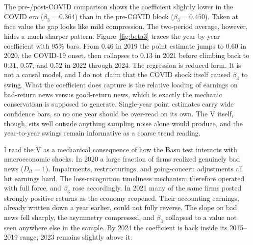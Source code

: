 \documentclass[12pt]{article}
\begin{document}
The pre-/post-COVID comparison shows the coefficient slightly lower in the COVID era ($\beta_{3} = 0.364$) than in the pre-COVID block ($\beta_{3} = 0.450$). Taken at face value the gap looks like mild compression. The two-period average, however, hides a much sharper pattern. Figure~\ref{fig:beta3} traces the year-by-year coefficient with 95\% bars. From $0.46$ in 2019 the point estimate jumps to $0.60$ in 2020, the COVID-19 onset, then collapses to $0.13$ in 2021 before climbing back to $0.31$, $0.57$, and $0.52$ in 2022 through 2024. The regression is reduced-form. It is not a causal model, and I do not claim that the COVID shock itself caused $\beta_3$ to swing. What the coefficient does capture is the relative loading of earnings on bad-return news versus good-return news, which is exactly the mechanic conservatism is supposed to generate. Single-year point estimates carry wide confidence bars, so no one year should be over-read on its own. The V itself, though, sits well outside anything sampling noise alone would produce, and the year-to-year swings remain informative as a coarse trend reading.

I read the V as a mechanical consequence of how the Basu test interacts with macroeconomic shocks. In 2020 a large fraction of firms realized genuinely bad news ($D_{it} = 1$). Impairments, restructurings, and going-concern adjustments all hit earnings hard. The loss-recognition timeliness mechanism therefore operated with full force, and $\beta_3$ rose accordingly. In 2021 many of the same firms posted strongly positive returns as the economy reopened. Their accounting earnings, already written down a year earlier, could not fully reverse. The slope on bad news fell sharply, the asymmetry compressed, and $\beta_3$ collapsed to a value not seen anywhere else in the sample. By 2024 the coefficient is back inside its 2015--2019 range; 2023 remains slightly above it.
\end{document}
